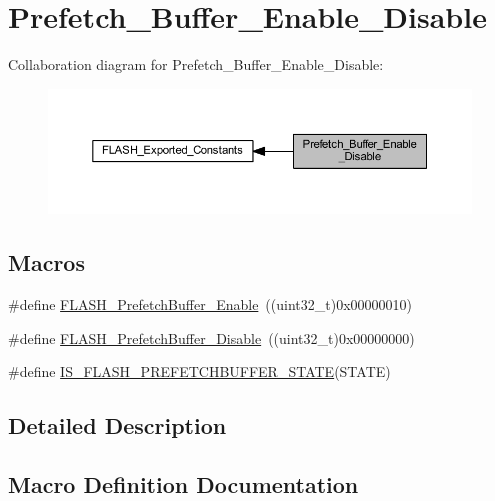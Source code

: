 \hypertarget{group___prefetch___buffer___enable___disable}{}\section{Prefetch\+\_\+\+Buffer\+\_\+\+Enable\+\_\+\+Disable}
\label{group___prefetch___buffer___enable___disable}
Collaboration diagram for Prefetch\+\_\+\+Buffer\+\_\+\+Enable\+\_\+\+Disable\+:
\nopagebreak
\begin{figure}[H]
\begin{center}
\leavevmode
\includegraphics[width=350pt]{group___prefetch___buffer___enable___disable}
\end{center}
\end{figure}
\subsection*{Macros}
\begin{DoxyCompactItemize}
\item 
\#define \hyperlink{group___prefetch___buffer___enable___disable_gad0fac43d078a77794f22840f326a6ed9}{F\+L\+A\+S\+H\+\_\+\+Prefetch\+Buffer\+\_\+\+Enable}~((uint32\+\_\+t)0x00000010)
\item 
\#define \hyperlink{group___prefetch___buffer___enable___disable_ga2feb631ad85449f83517f05aaf4ba26c}{F\+L\+A\+S\+H\+\_\+\+Prefetch\+Buffer\+\_\+\+Disable}~((uint32\+\_\+t)0x00000000)
\item 
\#define \hyperlink{group___prefetch___buffer___enable___disable_ga5fd6932c4f4e157a1d6e73d433df092f}{I\+S\+\_\+\+F\+L\+A\+S\+H\+\_\+\+P\+R\+E\+F\+E\+T\+C\+H\+B\+U\+F\+F\+E\+R\+\_\+\+S\+T\+A\+TE}(S\+T\+A\+TE)
\end{DoxyCompactItemize}


\subsection{Detailed Description}


\subsection{Macro Definition Documentation}
\mbox{\label{group___prefetch___buffer___enable___disable_ga2feb631ad85449f83517f05aaf4ba26c}} 
